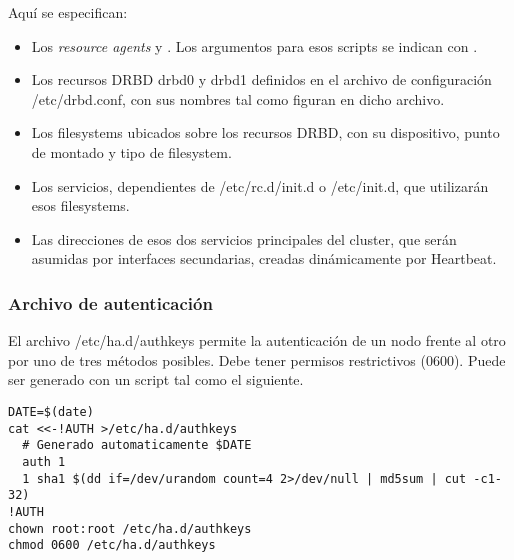 \begin{itemize}
Aquí se especifican:
\begin{itemize}
	\item Los \textit{resource agents}  y . Los argumentos para esos scripts se indican con \quotes{::}.
	\item Los recursos DRBD drbd0 y drbd1 definidos en el archivo de configuración /etc/drbd.conf, con sus nombres tal como figuran en dicho archivo.
	\item Los filesystems ubicados sobre los recursos DRBD, con su dispositivo, punto de montado y tipo de filesystem.
	\item Los servicios, dependientes de /etc/rc.d/init.d o /etc/init.d, que utilizarán esos filesystems.
	\item Las direcciones de esos dos servicios principales del cluster, que serán asumidas por interfaces secundarias, creadas dinámicamente por Heartbeat.
\end{itemize}

\end{itemize}










\subsubsection{Archivo de autenticación}
El archivo /etc/ha.d/authkeys permite la autenticación de un nodo frente al otro por uno de tres métodos posibles. Debe tener permisos restrictivos (0600). Puede ser generado con un script tal como el siguiente.

\begin{lstlisting}
DATE=$(date)
cat <<-!AUTH >/etc/ha.d/authkeys
  # Generado automaticamente $DATE
  auth 1
  1 sha1 $(dd if=/dev/urandom count=4 2>/dev/null | md5sum | cut -c1-32)
!AUTH
chown root:root /etc/ha.d/authkeys
chmod 0600 /etc/ha.d/authkeys
\end{lstlisting}

% 

